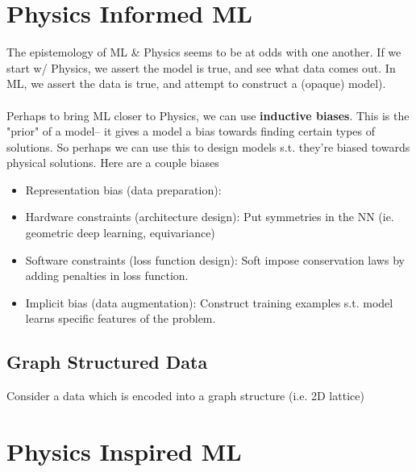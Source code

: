 \section{Physics Informed ML}
The epistemology of ML \& Physics seems to be at odds with one another. If we start w/ Physics, we assert the model is true, and see what data comes out. In ML, we assert the data is true, and attempt to construct a (opaque) model).\\
\\
Perhaps to bring ML closer to Physics, we can use \textbf{inductive biases}. This is the "prior" of a model-- it gives a model a bias towards finding certain types of solutions. So perhaps we can use this to design models s.t. they're biased towards physical solutions. Here are a couple biases
\begin{itemize}
	\item Representation bias (data preparation):
	\item Hardware constraints (architecture design): Put symmetries in the NN (ie. geometric deep learning, equivariance)
	\item Software constraints (loss function design): Soft impose conservation laws by adding penalties in loss function.
	\item Implicit bias (data augmentation): Construct training examples s.t. model learns specific features of the problem.
\end{itemize}
\subsection{Graph Structured Data}
Consider a data which is encoded into a graph structure (i.e. 2D lattice)



\section{Physics Inspired ML}